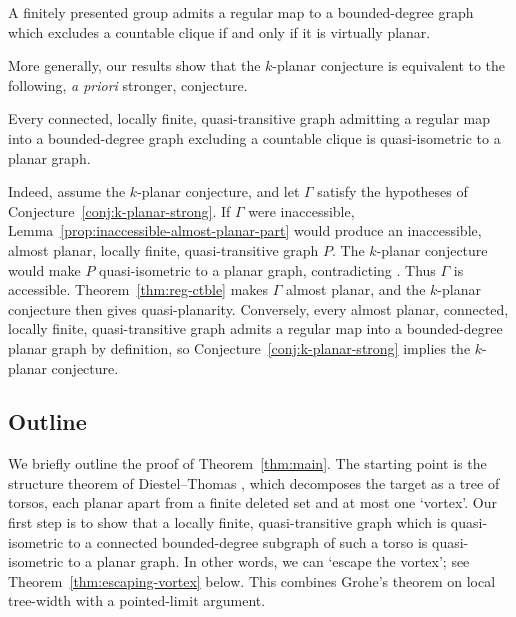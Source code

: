 \documentclass[a4paper]{amsart}
\begin{document}
\begin{alphcor}\label{cor:planar-rigidity-regularmaps}
     A finitely presented group admits a regular map to a bounded-degree graph which excludes a countable clique if and only if it is virtually planar. 
\end{alphcor}

More generally, our results show that the $k$-planar conjecture is equivalent to the following, \emph{a priori} stronger, conjecture.

\begin{conjecture}\label{conj:k-planar-strong}
    Every connected, locally finite, quasi-transitive graph admitting a regular map into a bounded-degree graph excluding a countable clique is quasi-isometric to a planar graph.
\end{conjecture}

Indeed, assume the $k$-planar conjecture, and let $\Gamma$ satisfy the hypotheses of Conjecture~\ref{conj:k-planar-strong}. If $\Gamma$ were inaccessible, Lemma~\ref{prop:inaccessible-almost-planar-part} would produce an inaccessible, almost planar, locally finite, quasi-transitive graph $P$. The $k$-planar conjecture would make $P$ quasi-isometric to a planar graph, contradicting \cite[Thm.~A]{macmanus2023accessibility}. Thus $\Gamma$ is accessible. Theorem~\ref{thm:reg-ctble} makes $\Gamma$ almost planar, and the $k$-planar conjecture then gives quasi-planarity. Conversely, every almost planar, connected, locally finite, quasi-transitive graph admits a regular map into a bounded-degree planar graph by definition, so Conjecture~\ref{conj:k-planar-strong} implies the $k$-planar conjecture.


\subsection{Outline}

We briefly outline the proof of Theorem~\ref{thm:main}. The starting point is the structure theorem of Diestel--Thomas \cite{diestel1999excluding}, which decomposes the target as a tree of torsos, each planar apart from a finite deleted set and at most one `vortex'. Our first step is to show that a locally finite, quasi-transitive graph which is quasi-isometric to a connected bounded-degree subgraph of such a torso is quasi-isometric to a planar graph. In other words, we can `escape the vortex'; see Theorem~\ref{thm:escaping-vortex} below. This combines Grohe's theorem on local tree-width \cite{Grohe03} with a pointed-limit argument.
\end{document}
